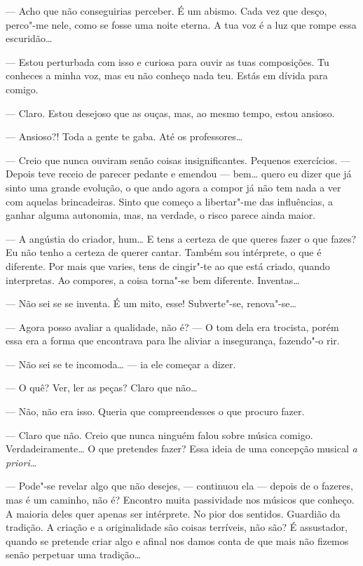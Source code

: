 --- Acho que não conseguirias perceber. É um abismo. Cada vez que desço,
perco"-me nele, como se fosse uma noite eterna. A tua voz é a luz que
rompe essa escuridão\ldots{}

--- Estou perturbada com isso e curiosa para ouvir as tuas composições. Tu
conheces a minha voz, mas eu não conheço nada teu. Estás em dívida para
comigo.

--- Claro. Estou desejoso que as ouças, mas, ao mesmo tempo, estou
ansioso.

--- Ansioso?! Toda a gente te gaba. Até os professores\ldots{}

--- Creio que nunca ouviram senão coisas insignificantes. Pequenos
exercícios. --- Depois teve receio de parecer pedante e emendou ---
bem\ldots{} quero eu dizer que já sinto uma grande evolução, o que ando agora
a compor já não tem nada a ver com aquelas brincadeiras. Sinto que
começo a libertar"-me das influências, a ganhar alguma autonomia, mas, na
verdade, o risco parece ainda maior.

--- A angústia do criador, hum\ldots{} E tens a certeza de que queres fazer o
que fazes? Eu não tenho a certeza de querer cantar. Também sou
intérprete, o que é diferente. Por mais que varies, tens de cingir"-te ao
que está criado, quando interpretas. Ao compores, a coisa torna"-se bem
diferente. Inventas\ldots{}

--- Não sei se se inventa. É um mito, esse! Subverte"-se, renova"-se\ldots{}

--- Agora posso avaliar a qualidade, não é? --- O tom dela era trocista,
porém essa era a forma que encontrava para lhe aliviar a insegurança,
fazendo"-o rir.

--- Não sei se te incomoda\ldots{} --- ia ele começar a dizer.

--- O quê? Ver, ler as peças? Claro que não\ldots{}

--- Não, não era isso. Queria que compreendesses o que procuro fazer.

--- Claro que não. Creio que nunca ninguém falou sobre música comigo.
Verdadeiramente\ldots{} O que pretendes fazer? Essa ideia de uma concepção
musical \emph{a priori\ldots{}}

--- Pode"-se revelar algo que não desejes, --- continuou ela --- depois
de o fazeres, mas é um caminho, não é? Encontro muita passividade nos
músicos que conheço. A maioria deles quer apenas ser intérprete. No pior
dos sentidos. Guardião da tradição. A criação e a originalidade são
coisas terríveis, não são? É assustador, quando se pretende criar algo e
afinal nos damos conta de que mais não fizemos senão perpetuar uma
tradição\ldots{}

